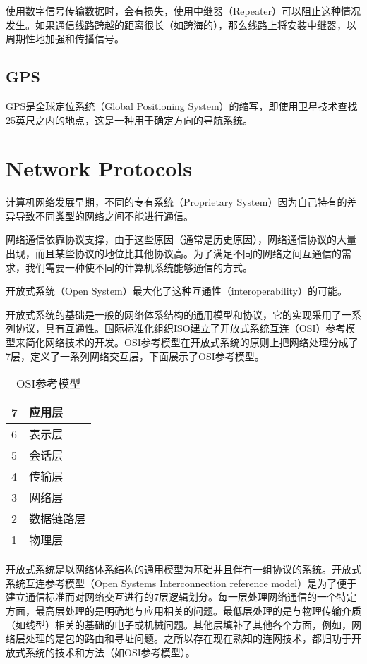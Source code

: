使用数字信号传输数据时，会有损失，使用中继器（Repeater）可以阻止这种情况发生。如果通信线路跨越的距离很长（如跨海的），那么线路上将安装中继器，以周期性地加强和传播信号。


\section{GPS}


GPS是全球定位系统（Global Positioning System）的缩写，即使用卫星技术查找25英尺之内的地点，这是一种用于确定方向的导航系统。


\chapter{Network Protocols}

计算机网络发展早期，不同的专有系统（Proprietary System）因为自己特有的差异导致不同类型的网络之间不能进行通信。

网络通信依靠协议支撑，由于这些原因（通常是历史原因），网络通信协议的大量出现，而且某些协议的地位比其他协议高。为了满足不同的网络之间互通信的需求，我们需要一种使不同的计算机系统能够通信的方式。


开放式系统（Open System）最大化了这种互通性（interoperability）的可能。


开放式系统的基础是一般的网络体系结构的通用模型和协议，它的实现采用了一系列协议，具有互通性。国际标准化组织ISO建立了开放式系统互连（OSI）参考模型来简化网络技术的开发。OSI参考模型在开放式系统的原则上把网络处理分成了7层，定义了一系列网络交互层，下面展示了OSI参考模型。

\begin{table}[!h]
\centering
\caption{OSI参考模型}
\label{Open_Systems_Interconnection_reference_model}
\begin{tabular}{|p{15pt}|p{80pt}|}
\hline
7	&应用层\\
\hline
6	&表示层\\
\hline
5	&会话层\\
\hline
4	&传输层\\
\hline
3	&网络层\\
\hline
2	&数据链路层\\
\hline
1	&物理层\\
\hline


\end{tabular}
\end{table}

开放式系统是以网络体系结构的通用模型为基础并且伴有一组协议的系统。开放式系统互连参考模型（Open Systems Interconnection reference model）是为了便于建立通信标准而对网络交互进行的7层逻辑划分。每一层处理网络通信的一个特定方面，最高层处理的是明确地与应用相关的问题。最低层处理的是与物理传输介质（如线型）相关的基础的电子或机械问题。其他层填补了其他各个方面，例如，网络层处理的是包的路由和寻址问题。之所以存在现在熟知的连网技术，都归功于开放式系统的技术和方法（如OSI参考模型）。



